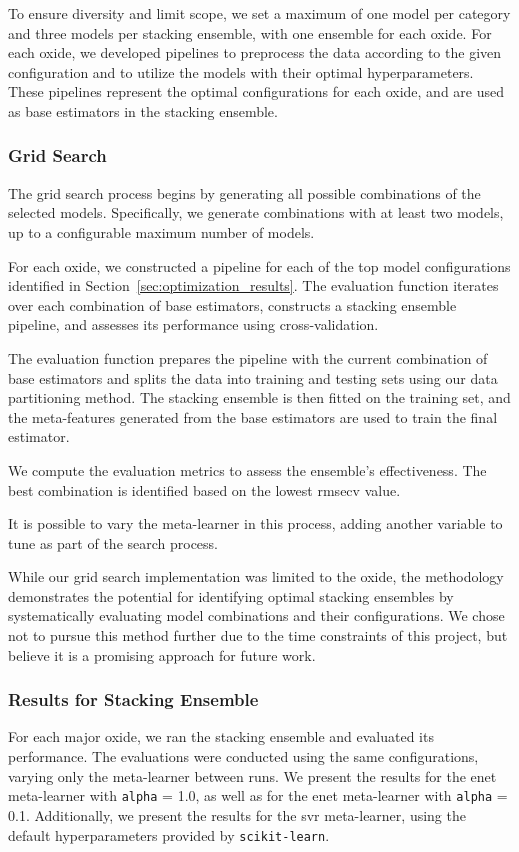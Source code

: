 To ensure diversity and limit scope, we set a maximum of one model per category and three models per stacking ensemble, with one ensemble for each oxide.
For each oxide, we developed pipelines to preprocess the data according to the given configuration and to utilize the models with their optimal hyperparameters.
These pipelines represent the optimal configurations for each oxide, and are used as base estimators in the stacking ensemble.

\subsubsection{Grid Search}\label{subsec:grid_search}
The grid search process begins by generating all possible combinations of the selected models.
Specifically, we generate combinations with at least two models, up to a configurable maximum number of models.

For each oxide, we constructed a pipeline for each of the top model configurations identified in Section~\ref{sec:optimization_results}.
The evaluation function iterates over each combination of base estimators, constructs a stacking ensemble pipeline, and assesses its performance using cross-validation.

The evaluation function prepares the pipeline with the current combination of base estimators and splits the data into training and testing sets using our data partitioning method.
The stacking ensemble is then fitted on the training set, and the meta-features generated from the base estimators are used to train the final estimator.

We compute the evaluation metrics to assess the ensemble's effectiveness.
The best combination is identified based on the lowest \gls{rmsecv} value.

It is possible to vary the meta-learner in this process, adding another variable to tune as part of the search process.

While our grid search implementation was limited to the  oxide, the methodology demonstrates the potential for identifying optimal stacking ensembles by systematically evaluating model combinations and their configurations.
We chose not to pursue this method further due to the time constraints of this project, but believe it is a promising approach for future work.


\subsubsection{Results for Stacking Ensemble}\label{subsec:stacking_ensemble_results}
For each major oxide, we ran the stacking ensemble and evaluated its performance.
The evaluations were conducted using the same configurations, varying only the meta-learner between runs.
We present the results for the \gls{enet} meta-learner with \texttt{alpha} = 1.0, as well as for the \gls{enet} meta-learner with \texttt{alpha} = 0.1.
Additionally, we present the results for the \gls{svr} meta-learner, using the default hyperparameters provided by \texttt{scikit-learn}.

